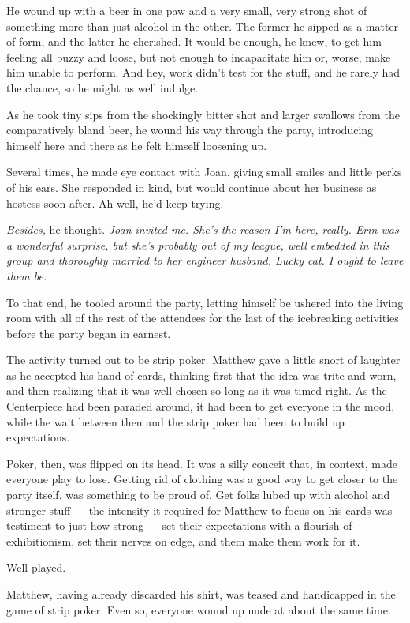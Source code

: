 He wound up with a beer in one paw and a very small, very strong shot of
something more than just alcohol in the other. The former he sipped as a
matter of form, and the latter he cherished. It would be enough, he
knew, to get him feeling all buzzy and loose, but not enough to
incapacitate him or, worse, make him unable to perform. And hey, work
didn't test for the stuff, and he rarely had the chance, so he might as
well indulge.

As he took tiny sips from the shockingly bitter shot and larger swallows
from the comparatively bland beer, he wound his way through the party,
introducing himself here and there as he felt himself loosening up.

Several times, he made eye contact with Joan, giving small smiles and
little perks of his ears. She responded in kind, but would continue
about her business as hostess soon after. Ah well, he'd keep trying.

\emph{Besides,} he thought. \emph{Joan invited me. She's the reason I'm
here, really. Erin was a wonderful surprise, but she's probably out of
my league, well embedded in this group and thoroughly married to her
engineer husband. Lucky cat. I ought to leave them be.}

To that end, he tooled around the party, letting himself be ushered into
the living room with all of the rest of the attendees for the last of
the icebreaking activities before the party began in earnest.

The activity turned out to be strip poker. Matthew gave a little snort
of laughter as he accepted his hand of cards, thinking first that the
idea was trite and worn, and then realizing that it was well chosen so
long as it was timed right. As the Centerpiece had been paraded around,
it had been to get everyone in the mood, while the wait between then and
the strip poker had been to build up expectations.

Poker, then, was flipped on its head. It was a silly conceit that, in
context, made everyone play to lose. Getting rid of clothing was a good
way to get closer to the party itself, was something to be proud of. Get
folks lubed up with alcohol and stronger stuff --- the intensity it
required for Matthew to focus on his cards was testiment to just how
strong --- set their expectations with a flourish of exhibitionism, set
their nerves on edge, and them make them work for it.

Well played.

Matthew, having already discarded his shirt, was teased and handicapped
in the game of strip poker. Even so, everyone wound up nude at about the
same time.

